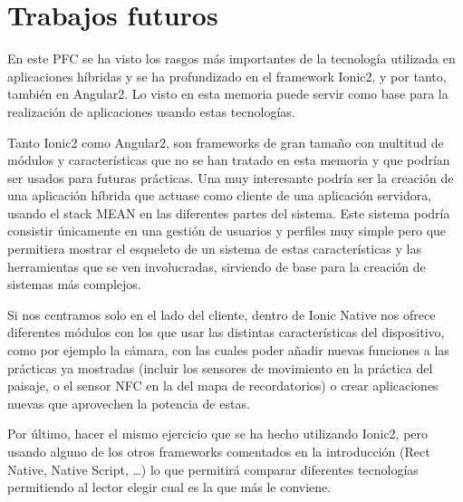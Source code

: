 \chapter*{Trabajos futuros}

En este \gls{PFC} se ha visto los rasgos más importantes de la tecnología utilizada en aplicaciones híbridas y se ha profundizado en el framework Ionic2, y por tanto, también en Angular2. Lo visto en esta memoria puede servir como base para la realización de aplicaciones usando estas tecnologías.

Tanto Ionic2 como Angular2, son frameworks de gran tamaño con multitud de módulos y características que no se han tratado en esta memoria y que podrían ser usados para futuras prácticas. Una muy interesante podría ser la creación de una aplicación híbrida que actuase como cliente de una aplicación servidora, usando el stack \gls{MEAN} en las diferentes partes del sistema. Este sistema podría consistir únicamente en una gestión de usuarios y perfiles muy simple pero que permitiera mostrar el esqueleto de un sistema de estas características y las herramientas que se ven involucradas, sirviendo de base para la creación de sistemas más complejos.

Si nos centramos solo en el lado del cliente, dentro de Ionic Native nos ofrece diferentes módulos con los que usar las distintas características del dispositivo, como por ejemplo la cámara, con las cuales poder añadir nuevas funciones a las prácticas ya mostradas (incluir los sensores de movimiento en la práctica del paisaje, o el sensor \gls{NFC} en la del mapa de recordatorios) o crear aplicaciones nuevas que aprovechen la potencia de estas.

Por último, hacer el mismo ejercicio que se ha hecho utilizando Ionic2, pero usando alguno de los otros frameworks comentados en la introducción (Rect Native, Native Script, \ldots) lo que permitirá comparar diferentes tecnologías permitiendo al lector elegir cual es la que más le conviene.
